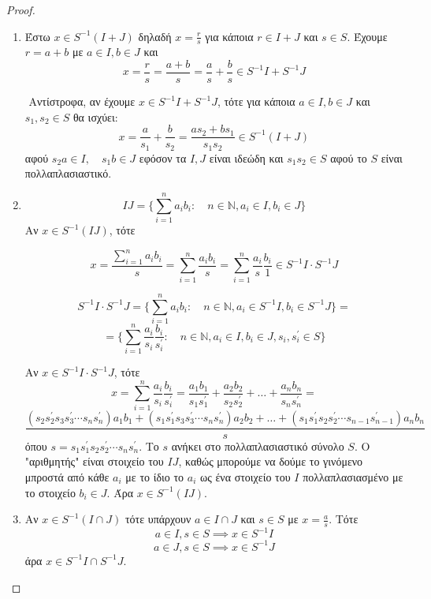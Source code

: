 \documentclass[oneside,a4paper]{article}
\begin{document}
\begin{proof} $ $
	\vspace{1cm}
	\begin{enumerate}
		\item Έστω $x \in S^{-1}(I +J)$ δηλαδή $x = \frac rs$ για κάποια $r \in I+J$ και $s \in S$. Έχουμε $r=a + b$ με $a \in I, b \in J$ και
		$$x= \frac rs = \frac{a+b}{s} = \frac as + \frac bs \in S^{-1} I  + S^{-1} J$$

		$ $\newline
		Αντίστροφα, αν έχουμε $x \in S^{-1} I  + S^{-1} J$, τότε για κάποια $a \in I, b\in J$ και $s_1,s_2 \in S$ θα ισχύει:
		$$x = \frac a{s_1} + \frac b{s_2} = \frac{as_2 + bs_1}{s_1 s_2} \in S^{-1}(I+J)$$
		αφού $s_2 a \in I, \quad s_1 b \in J$ εφόσον τα $I,J$ είναι ιδεώδη και $s_1 s_2 \in S$ αφού το $S$ είναι πολλαπλασιαστικό.

		\item 
		$$IJ = \big\{ \sum\limits_{i=1}^n a_i b_i: \quad n\in \mathbb{N}, a_i \in I, b_i \in J\big\}$$
		Αν $x \in S^{-1} (IJ)$, τότε 

		$$ x = \frac{\sum\limits_{i=1}^n a_i b_i}{s}= \sum\limits_{i=1}^n \frac{a_i b_i}s = \sum\limits_{i=1}^n \frac {a_i}s \frac {b_i}1 \in S^{-1}I \cdot S^{-1}J$$

		$$S^{-1}I \cdot S^{-1}J = \big\{ \sum\limits_{i=1}^n a_i b_i: \quad n\in \mathbb{N}, a_i \in S^{-1}I, b_i \in S^{-1}J\big\} = $$
		$$ = \big\{ \sum\limits_{i=1}^n \frac{a_i}{s_i} \frac{b_i}{s^{\prime}_i} : \quad n\in \mathbb{N}, a_i \in I, b_i \in J, s_i,s^{\prime}_i \in S\big\}$$

		Αν $x \in S^{-1}I \cdot S^{-1}J$, τότε
		$$x = \sum\limits_{i=1}^n \frac{a_i}{s_i} \frac{b_i}{s^{\prime}_i} = \frac{a_1 b_1}{s_1 s^{\prime}_1} + \frac{a_2 b_2}{s_2 s^{\prime}_2} + \ldots + \frac{a_n b_n}{s_n s^{\prime}_n} = $$
		$$ \frac{(s_2 s^{\prime}_2 s_3 s^{\prime}_3 \cdots s_n s^{\prime}_n )a_1 b_1 + (s_1 s^{\prime}_1 s_3 s^{\prime}_3 \cdots s_n s^{\prime}_n )a_2 b_2 + \ldots + (s_1 s^{\prime}_1 s_2 s^{\prime}_2 \cdots s_{n-1} s^{\prime}_{n-1} )a_n b_n}{s}$$ 
		όπου $s = s_1 s^{\prime}_1 s_2 s^{\prime}_2 \cdots s_n s^{\prime}_n$. Το $s$ ανήκει στο πολλαπλασιαστικό σύνολο $S$. O "αριθμητής" είναι στοιχείο του $IJ$, καθώς μπορούμε να δούμε το γινόμενο μπροστά από κάθε $a_i$ με το ίδιο το $a_i$ ως ένα στοιχείο του $I$ πολλαπλασιασμένο με το στοιχείο $b_i \in J$. Άρα $x \in S^{-1}(IJ)$.


		\item Αν $x \in S^{-1}(I\cap J)$ τότε υπάρχουν $a \in I \cap J$ και $s \in S$ με $x = \frac as$. Τότε 
		$$a \in I, s \in S \implies x \in S^{-1}I$$
		$$a \in J, s \in S \implies x \in S^{-1}J$$
		άρα $x \in S^{-1}I \cap S^{-1}J$.


\end{enumerate}
\end{proof}
\end{document}
